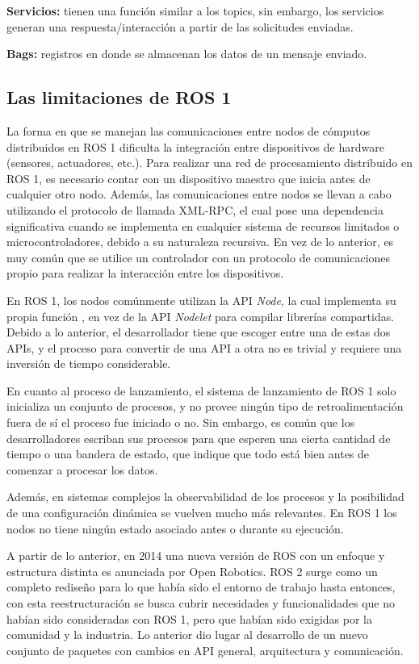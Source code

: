 \textbf{Servicios:} tienen una función similar a los topics, sin embargo, los servicios generan una respuesta/interacción a partir de las solicitudes enviadas.

\textbf{Bags:} registros en donde se almacenan los datos de un mensaje enviado.

\subsection{Las limitaciones de ROS 1}

La forma en que se manejan las comunicaciones entre nodos de cómputos distribuidos en ROS 1 dificulta la integración entre dispositivos de hardware (sensores, actuadores, etc.). Para realizar una red de procesamiento distribuido en ROS 1, es necesario contar con un dispositivo maestro que inicia antes de cualquier otro nodo. Además, las comunicaciones entre nodos se llevan a cabo utilizando el protocolo de llamada XML-RPC, el cual pose una dependencia significativa cuando se implementa en cualquier sistema de recursos limitados o microcontroladores, debido a su naturaleza recursiva. En vez de lo anterior, es muy común que se utilice un controlador con un protocolo de comunicaciones propio para realizar la interacción entre los dispositivos.

En ROS 1, los nodos comúnmente utilizan la API \textit{Node}, la cual implementa su propia función , en vez de la API \textit{Nodelet} para compilar librerías compartidas. Debido a lo anterior, el desarrollador tiene que escoger entre una de estas dos APIs, y el proceso para convertir de una API a otra no es trivial y requiere una inversión de tiempo considerable.

En cuanto al proceso de lanzamiento, el sistema de lanzamiento de ROS 1 solo inicializa un conjunto de procesos, y no provee ningún tipo de retroalimentación fuera de sí el proceso fue iniciado o no. Sin embargo, es común que los desarrolladores escriban sus procesos para que esperen una cierta cantidad de tiempo o una bandera de estado, que indique que todo está bien antes de comenzar a procesar los datos. 

Además, en sistemas complejos la observabilidad de los procesos y la posibilidad de una configuración dinámica se vuelven mucho más relevantes. En ROS 1 los nodos no tiene ningún estado asociado antes o durante su ejecución.
   
A partir de lo anterior, en 2014 una nueva versión de ROS con un enfoque y estructura distinta es anunciada por Open Robotics.  ROS 2 surge como un completo rediseño para lo que había sido el entorno de trabajo hasta entonces, con esta reestructuración se busca cubrir necesidades y funcionalidades que no habían sido consideradas con  ROS 1, pero que habían sido exigidas por la comunidad y la industria. Lo anterior dio lugar al desarrollo de un nuevo conjunto de paquetes con cambios en API general, arquitectura y comunicación. 

